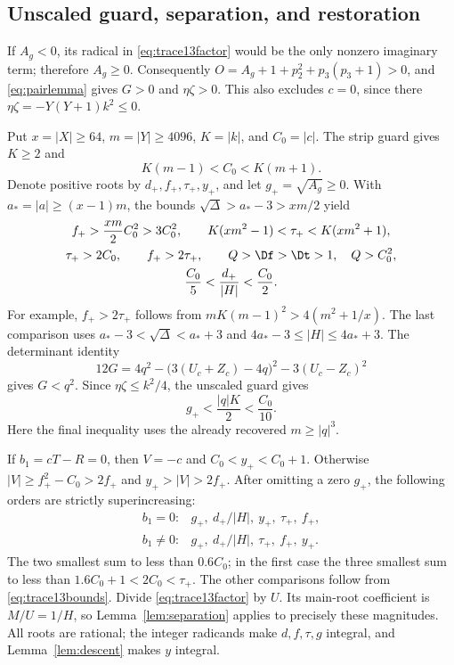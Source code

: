 \subsection{Unscaled guard, separation, and restoration}

If $A_g<0$, its radical in \eqref{eq:trace13factor} would be the only
nonzero imaginary term; therefore $A_g\ge0$. Consequently
$O=A_g+1+p_2^2+p_3(p_3+1)>0$, and \eqref{eq:pairlemma} gives
$G>0$ and $\eta\zeta>0$. This also excludes $c=0$, since there
$\eta\zeta=-Y(Y+1)k^2\le0$.

Put $x=|X|\ge64$, $m=|Y|\ge4096$, $K=|k|$, and $C_0=|c|$.
The strip guard gives $K\ge2$ and
\begin{equation}
 K(m-1)<C_0<K(m+1).
 \label{eq:trace13strip}
\end{equation}
Denote positive roots by $d_+,f_+,\tau_+,y_+$, and let
$g_+=\sqrt{A_g}\ge0$. With $a_*=|a|\ge(x-1)m$, the bounds
$\sqrt\Delta>a_*-3>xm/2$ yield
\begin{gather}
 f_+>\frac{xm}{2}C_0^2>3C_0^2,\qquad
 K(xm^2-1)<\tau_+<K(xm^2+1),\nonumber\\
 \tau_+>2C_0,\qquad f_+>2\tau_+,\qquad
 Q>\Df>\Dt>1,\quad Q>C_0^2,\nonumber\\
 \frac{C_0}{5}<\frac{d_+}{|H|}<\frac{C_0}{2}.
 \label{eq:trace13bounds}
\end{gather}
For example, $f_+>2\tau_+$ follows from
$mK(m-1)^2>4(m^2+1/x)$. The last comparison uses
$a_*-3<\sqrt\Delta<a_*+3$ and
$4a_*-3\le|H|\le4a_*+3$.
The determinant identity
\[
 12G=4q^2-\bigl(3(U_c+Z_c)-4q\bigr)^2-3(U_c-Z_c)^2
\]
gives $G<q^2$. Since $\eta\zeta\le k^2/4$, the unscaled guard gives
\begin{equation}
 g_+<\frac{|q|K}{2}<\frac{C_0}{10}.
 \label{eq:trace13guardbound}
\end{equation}
Here the final inequality uses the already recovered $m\ge|q|^3$.

If $b_1=cT-R=0$, then $V=-c$ and
$C_0<y_+<C_0+1$. Otherwise
$|V|\ge f_+^2-C_0>2f_+$ and $y_+>|V|>2f_+$.
After omitting a zero $g_+$, the following orders are strictly
superincreasing:
\begin{equation}
 \begin{array}{ll}
 b_1=0:&g_+,\ d_+/|H|,\ y_+,\ \tau_+,\ f_+,\\
 b_1\ne0:&g_+,\ d_+/|H|,\ \tau_+,\ f_+,\ y_+.
 \end{array}
 \label{eq:trace13orders}
\end{equation}
The two smallest sum to less than $0.6C_0$; in the first case the
three smallest sum to less than $1.6C_0+1<2C_0<\tau_+$.
The other comparisons follow from \eqref{eq:trace13bounds}.
Divide \eqref{eq:trace13factor} by $U$. Its main-root coefficient is
$M/U=1/H$, so Lemma~\ref{lem:separation} applies to precisely these
magnitudes. All roots are rational; the integer radicands make
$d,f,\tau,g$ integral, and Lemma~\ref{lem:descent} makes $y$ integral.

